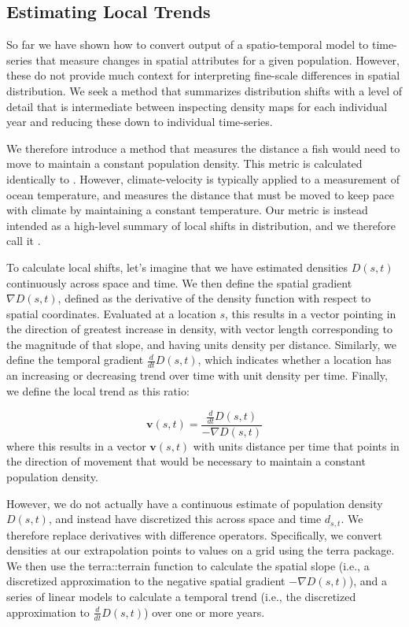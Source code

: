 \subsection{Estimating Local Trends}

So far we have shown how to convert output of a spatio-temporal model to time-series that measure changes in spatial attributes for a given population.  However, these do not provide much context for interpreting fine-scale differences in spatial distribution.  We seek a method that summarizes distribution shifts with a level of detail that is intermediate between inspecting density maps for each individual year and reducing these down to individual time-series.

We therefore introduce a method that measures the distance a fish would need to move to maintain a constant population density.  This metric is calculated identically to  \cite{burrows_ocean_2019,burrows_pace_2011}.  However, climate-velocity is typically applied to a measurement of ocean temperature, and measures the distance that must be moved to keep pace with climate by maintaining a constant temperature.  Our metric is instead intended as a high-level summary of local shifts in distribution, and we therefore call it .

To calculate local shifts, let's imagine that we have estimated densities \(D(s,t)\) continuously across space and time.  We then define the spatial gradient \( \nabla D(s,t) \), defined as the derivative of the density function with respect to spatial coordinates.  Evaluated at a location \(s\), this results in a vector pointing in the direction of greatest increase in density, with vector length corresponding to the magnitude of that slope, and having units density per distance.  Similarly, we define the temporal gradient \( \frac{d}{dt} D(s,t) \), which indicates whether a location has an increasing or decreasing trend over time with unit density per time.  Finally, we define the local trend as this ratio:

\begin{equation}
  \mathbf{v}(s,t) = \frac{\frac{d}{dt} D(s,t)}{-\nabla D(s,t)}    
\end{equation}
where this results in a vector \( \mathbf{v}(s,t) \) with units distance per time that points in the direction of movement that would be necessary to maintain a constant population density.  

However, we do not actually have a continuous estimate of population density \(D(s,t)\), and instead have discretized this across space and time \(d_{s,t}\).  We therefore replace  derivatives with difference operators.  Specifically, we convert densities at our extrapolation points to values on a grid using the \colorbox{backcolour}{terra} package.  We then use the \colorbox{backcolour}{terra::terrain} function to calculate the spatial slope (i.e., a discretized approximation to the negative spatial gradient \(-\nabla D(s,t)\)), and a series of linear models to calculate a temporal trend (i.e., the discretized approximation to \(\frac{d}{dt} D(s,t)\)) over one or more years.  

